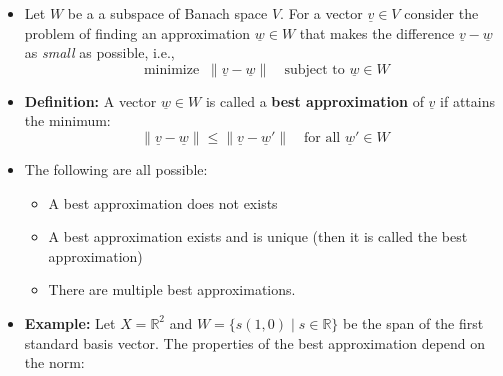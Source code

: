 \documentclass[11pt,twoside]{report}
\newcommand{\bbR}{{\mathbb{R}}}
\newcommand{\vecnot}{\underline}
\DeclareMathOperator*{\minimize}{minimize}
\begin{document}
\begin{itemize}

\item %
Let $W$ be a a subspace of Banach space $V$. For a vector $\vecnot{v} \in V$ consider the problem of finding an approximation $ \vecnot{w} \in W$ that makes the difference $\vecnot{v} - \vecnot{w}$ as \emph{small} as possible, i.e., 
\[
\minimize \;  \| \vecnot{v} - \vecnot{w} \| \quad \text{subject to  }  \vecnot{w} \in W
\]

\item \textbf{Definition:} A vector $\vecnot{w} \in W$ is called a \textbf{best approximation} of $\vecnot{v}$ if attains the minimum:
\[
\| \vecnot{v} - \vecnot{w} \|  \le \| \vecnot{v} - \vecnot{w}' \|  \quad \text{for all $\vecnot{w}' \in W$}
\]


\item The  following are all possible: 
\begin{itemize}
\item A best approximation does not exists
\item A best approximation exists and is unique (then it is called the best approximation)
\item There are multiple best approximations. 
\end{itemize}


\item \textbf{Example:} Let $X = \bbR^2$ and $W = \{ s (1, 0)  \mid s \in \bbR\}$ be the span of the first standard basis vector. The properties of the best approximation depend on the norm:   
\begin{center}
\end{center}
\end{itemize}
\end{document}
